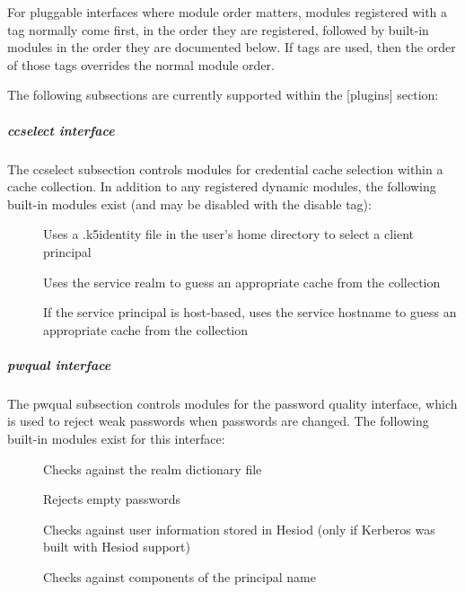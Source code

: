 \documentclass[letterpaper,10pt,english]{sphinxmanual}
\begin{document}
For pluggable interfaces where module order matters, modules
registered with a  tag normally come first, in the order
they are registered, followed by built-in modules in the order they
are documented below.  If  tags are used, then the
order of those tags overrides the normal module order.

The following subsections are currently supported within the {[}plugins{]}
section:


\subparagraph{ccselect interface}
\label{\detokenize{admin/conf_files/krb5_conf:ccselect}}\label{\detokenize{admin/conf_files/krb5_conf:ccselect-interface}}
The ccselect subsection controls modules for credential cache
selection within a cache collection.  In addition to any registered
dynamic modules, the following built-in modules exist (and may be
disabled with the disable tag):
\begin{description}
\item[{}] \leavevmode
Uses a .k5identity file in the user’s home directory to select a
client principal

\item[{}] \leavevmode
Uses the service realm to guess an appropriate cache from the
collection

\item[{}] \leavevmode
If the service principal is host-based, uses the service hostname
to guess an appropriate cache from the collection

\end{description}


\subparagraph{pwqual interface}
\label{\detokenize{admin/conf_files/krb5_conf:pwqual-interface}}\label{\detokenize{admin/conf_files/krb5_conf:pwqual}}
The pwqual subsection controls modules for the password quality
interface, which is used to reject weak passwords when passwords are
changed.  The following built-in modules exist for this interface:
\begin{description}
\item[{}] \leavevmode
Checks against the realm dictionary file

\item[{}] \leavevmode
Rejects empty passwords

\item[{}] \leavevmode
Checks against user information stored in Hesiod (only if Kerberos
was built with Hesiod support)

\item[{}] \leavevmode
Checks against components of the principal name

\end{description}
\end{document}
